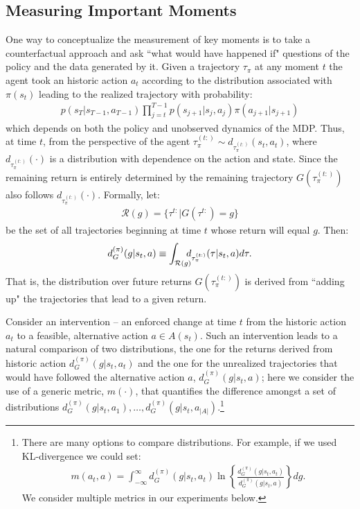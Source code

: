 \documentclass[conference]{IEEEtran}
\begin{document}
\subsection{Measuring Important Moments}
\noindent One way to conceptualize the measurement of key moments is to take a counterfactual approach and ask ``what would have happened if" questions of the policy and the data generated by it.  Given a trajectory $\tau_{\pi}$ at any moment $t$ the agent took an historic action $a_t$ according to the distribution associated with $\pi(s_t)$ leading to the realized trajectory with probability:
\begin{align*}
p(s_T|s_{T-1},a_{T-1})\prod_{j=t}^{T-1}p(s_{j+1}|s_j,a_j)\pi(a_{j+1}|s_{j+1})
\end{align*}
which depends on both the policy and unobserved dynamics of the MDP.  Thus, at time $t$, from the perspective of the agent $\tau_{\pi}^{(t:)}\sim d_{\tau_{\pi}^{(t:)}}(s_t,a_t)$, where $d_{\tau_{\pi}^{(t:)}}(\cdot)$ is a distribution with dependence on the action and state.  Since the remaining return is entirely determined by the remaining trajectory $G(\tau_{\pi}^{(t:)})$ also follows $d_{\tau_{\pi}^{(t:)}}(\cdot)$.  Formally, let:
\begin{align*}
    \mathcal{R}(g) = \{\tau^{t:}|G(\tau^{t:})=g\}
\end{align*}
be the set of all trajectories beginning at time $t$ whose return will equal $g$. Then:
\begin{align}
    d_G^{(\pi)}(g|s_t,a) \equiv \int_{\mathcal{R}(g)}\hspace{-2.5mm}d_{\tau_{\pi}^{(t:)}}(\tau|s_t,a)d\tau.
\end{align}
That is, the distribution over future returns $G(\tau_{\pi}^{(t:)})$ is derived from ``adding up" the trajectories that lead to a given return.

Consider an intervention -- an enforced change at time $t$ from the historic action $a_t$ to a feasible, alternative action $a\in A(s_t)$.  Such an intervention leads to a natural comparison of two distributions, the one for the returns derived from historic action $d_G^{(\pi)}(g|s_t,a_t)$ and the one for the unrealized trajectories that would have followed the alternative action $a$, $d_G^{(\pi)}(g|s_t,a)$; here we consider the use of a generic metric, $m(\cdot)$, that quantifies the difference amongst a set of distributions $d_G^{(\pi)}(g|s_t,a_1),\hdots,d_G^{(\pi)}(g|s_t,a_{|A|})$.\footnote{There are many options to compare distributions.  For example, if we used KL-divergence we could set:
\begin{align*}
    m(a_t,a) = \int_{-\infty}^{\infty}d_G^{(\pi)}(g|s_t,a_t)\ln\left\{\frac{d_G^{(\pi)}(g|s_t,a_t)}{d_G^{(\pi)}(g|s_t,a)}\right\}dg.
\end{align*}  We consider multiple metrics in our experiments below.}
\end{document}
